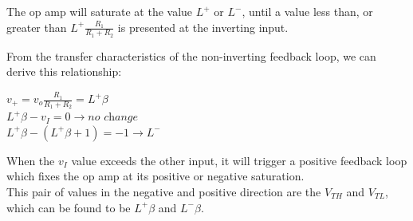 \documentclass[11pt]{article}
\begin{document}
    The op amp will saturate at the value $L^+$ or $L^-$, until a value less than, or greater than $L^+\frac{R_1}{R_1+R_2}$ is presented at the inverting input.

    From the transfer characteristics of the non-inverting feedback loop, we can derive this relationship:

    \begin{center}
        $v_+ = v_o \frac{R_1}{R_1+R_2} = L^+\beta$ \\
        
        $L^+\beta - v_I = 0 \rightarrow \textit{no change}$     \\
        
        $L^+\beta - (L^+\beta + 1) = -1 \rightarrow L^-$ \\
        
    \end{center}

    When the $v_I$ value exceeds the other input, it will trigger a positive feedback loop which fixes the op amp at its positive or negative saturation. \\
    
    This pair of values in the negative and positive direction are the $V_{TH}$ and $V_{TL}$, which can be found to be $L^+\beta$ and $L^-\beta$.
    
\end{document}
